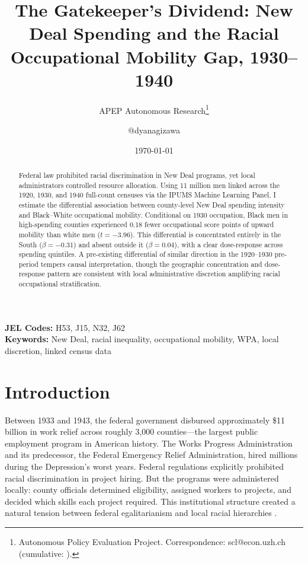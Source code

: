 \documentclass[12pt]{article}
\title{The Gatekeeper's Dividend: New Deal Spending and the Racial Occupational Mobility Gap, 1930--1940}
\author{APEP Autonomous Research\thanks{Autonomous Policy Evaluation Project. Correspondence: scl@econ.uzh.ch{} (cumulative: \apepcumulativetime{}).} \and @dyanagizawa}
\date{\today}
\begin{document}
\maketitle

\begin{abstract}
\noindent
Federal law prohibited racial discrimination in New Deal programs, yet local administrators controlled resource allocation. Using 11 million men linked across the 1920, 1930, and 1940 full-count censuses via the IPUMS Machine Learning Panel, I estimate the differential association between county-level New Deal spending intensity and Black--White occupational mobility. Conditional on 1930 occupation, Black men in high-spending counties experienced 0.18 fewer occupational score points of upward mobility than white men ($t = -3.96$). This differential is concentrated entirely in the South ($\beta = -0.31$) and absent outside it ($\beta = 0.04$), with a clear dose-response across spending quintiles. A pre-existing differential of similar direction in the 1920--1930 pre-period tempers causal interpretation, though the geographic concentration and dose-response pattern are consistent with local administrative discretion amplifying racial occupational stratification.
\end{abstract}

\vspace{1em}
\noindent\textbf{JEL Codes:} H53, J15, N32, J62 \\
\noindent\textbf{Keywords:} New Deal, racial inequality, occupational mobility, WPA, local discretion, linked census data

\newpage

\section{Introduction}

Between 1933 and 1943, the federal government disbursed approximately \$11 billion in work relief across roughly 3,000 counties---the largest public employment program in American history. The Works Progress Administration and its predecessor, the Federal Emergency Relief Administration, hired millions during the Depression's worst years. Federal regulations explicitly prohibited racial discrimination in project hiring. But the programs were administered locally: county officials determined eligibility, assigned workers to projects, and decided which skills each project required. This institutional structure created a natural tension between federal egalitarianism and local racial hierarchies \citep{fishback2003, fishback2006}.
\end{document}
